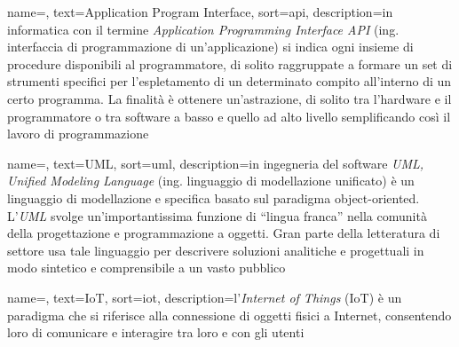 


 {
    name=,
    text=Application Program Interface,
    sort=api,
    description={in informatica con il termine \emph{Application Programming Interface API} (ing. interfaccia di programmazione di un'applicazione) si indica ogni insieme di procedure disponibili al programmatore, di solito raggruppate a formare un set di strumenti specifici per l'espletamento di un determinato compito all'interno di un certo programma. La finalità è ottenere un'astrazione, di solito tra l'hardware e il programmatore o tra software a basso e quello ad alto livello semplificando così il lavoro di programmazione}
}

 {
    name=,
    text=UML,
    sort=uml,
    description={in ingegneria del software \emph{UML, Unified Modeling Language} (ing. linguaggio di modellazione unificato) è un linguaggio di modellazione e specifica basato sul paradigma object-oriented. L'\emph{UML} svolge un'importantissima funzione di ``lingua franca'' nella comunità della progettazione e programmazione a oggetti. Gran parte della letteratura di settore usa tale linguaggio per descrivere soluzioni analitiche e progettuali in modo sintetico e comprensibile a un vasto pubblico}
}

 {
    name=,
    text=IoT,
    sort=iot,
    description={l'\emph{Internet of Things} (IoT) è un paradigma che si riferisce alla connessione di oggetti fisici a Internet, consentendo loro di comunicare e interagire tra loro e con gli utenti}
}